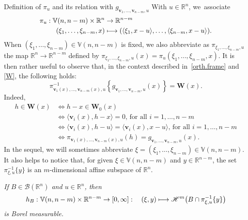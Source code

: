 \documentclass[JEP,XML,SOM,Unicode,ThmDefs,NoEqCountersInSection]{cedram}
\newcommand\mto{\mathchoice{\longmapsto}{\mapsto}{\mapsto}{\mapsto}}
\newenvironment{Empty}[2][\null]{%
\begin{enonce}[remark]{#1}#2}
{\end{enonce}}
\newcommand{\R}{\mathbb{R}}
\newcommand{\Rn}{\R^n}
\newcommand{\calB}{\mathscr{B}}
\newcommand{\calH}{\mathscr{H}}
\newcommand{\bW}{{\boldsymbol{W}}}
\newcommand{\bv}{{\boldsymbol{v}}}
\newcommand{\bV}{\mathbb{V}}
\let\la\langle
\let\ra\rangle
\begin{document}
\begin{Empty}[Definition of $\pi_u$ and its relation with $g_{\bv_1,\ldots,\bv_{n-m},u}$]
\label{pi.u}
With $u \in \Rn$, we~asso\-ciate
\begin{align*}
\pi_u: \bV(n,n-m) \times \Rn &\to \R^{n-m}\\
(\xi_1,\ldots,\xi_{n-m},x) &\mto(\la \xi_1,x-u\ra, \ldots, \la \xi_{n-m},x-u\ra).
\end{align*}
When $(\xi_1,\ldots,\xi_{n-m}) \in \bV(n,n-m)$ is fixed, we also abbreviate as $\pi_{\xi_1,\ldots,\xi_{n-m},u}$ the map $\Rn \to \R^{n-m}$ defined by $\pi_{\xi_1,\ldots,\xi_{n-m},u}(x) = \pi_u(\xi_1,\ldots,\xi_{n-m},x)$.
It is then rather useful to observe that, in the context described in~\ref{orth.frame} and \ref{W}, the following holds:
\begin{equation}
\label{eq.4}
\pi_{\bv_1(x),\ldots,\bv_{n-m}(x),u}^{-1}\left\{ g_{\bv_1,\ldots,\bv_{n-m},u}(x) \right\} = \bW(x).
\end{equation}
Indeed,
\begin{equation*}
\begin{split}
h \in \bW(x) & \iff h-x \in \bW_0(x) \\
& \iff \la \bv_i(x), h-x \ra = 0 \text{, for all } i=1,\ldots,n-m \\
& \iff \la \bv_i(x), h-u \ra = \la \bv_i(x), x-u \ra \text{, for all } i=1,\ldots,n-m \\
& \iff \pi_{\bv_1(x),\ldots,\bv_{n-m}(x),u}(h) = g_{\bv_1,\ldots,\bv_{n-m},u}(x).
\end{split}
\end{equation*}
In the sequel, we will sometimes abbreviate $\xi = (\xi_1,\ldots,\xi_{n-m}) \in \bV(n,n-m)$.
It also helps to notice that, for given $\xi \in \bV(n,n-m)$ and $y \in \R^{n-m}$, the set $\pi_{\xi,u}^{-1}\{y\}$ is an $m$-dimensional affine subspace of $\Rn$.
\end{Empty}

\begin{Empty}[]
\label{measurability}
{\it
If $B \in \calB(\Rn)$ and $u \in \Rn$, then
\begin{equation*}
h_{B}: \bV(n,n-m) \times \R^{n-m} \to [0,\infty]:\quad (\xi,y) \mto \calH^m\bigl(B \cap \pi_{\xi,u}^{-1}\{y\} \bigr)
\end{equation*}
is Borel measurable.
}
\end{Empty}
\end{document}
